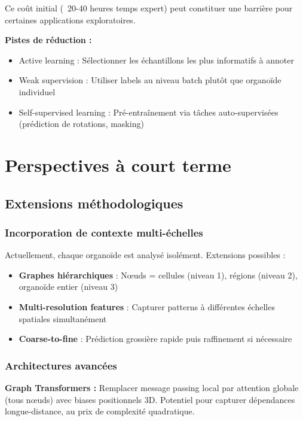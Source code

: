 Ce coût initial (~20-40 heures temps expert) peut constituer une barrière pour certaines applications exploratoires.

\textbf{Pistes de réduction :}
\begin{itemize}
    \item Active learning : Sélectionner les échantillons les plus informatifs à annoter
    \item Weak supervision : Utiliser labels au niveau batch plutôt que organoïde individuel
    \item Self-supervised learning : Pré-entraînement via tâches auto-supervisées (prédiction de rotations, masking)
\end{itemize}

\section{Perspectives à court terme}

\subsection{Extensions méthodologiques}

\subsubsection{Incorporation de contexte multi-échelles}

Actuellement, chaque organoïde est analysé isolément. Extensions possibles :
\begin{itemize}
    \item \textbf{Graphes hiérarchiques} : Nœuds = cellules (niveau 1), régions (niveau 2), organoïde entier (niveau 3)
    \item \textbf{Multi-resolution features} : Capturer patterns à différentes échelles spatiales simultanément
    \item \textbf{Coarse-to-fine} : Prédiction grossière rapide puis raffinement si nécessaire
\end{itemize}

\subsubsection{Architectures avancées}

\textbf{Graph Transformers :}
Remplacer message passing local par attention globale (tous nœuds) avec biases positionnels 3D. Potentiel pour capturer dépendances longue-distance, au prix de complexité quadratique.

